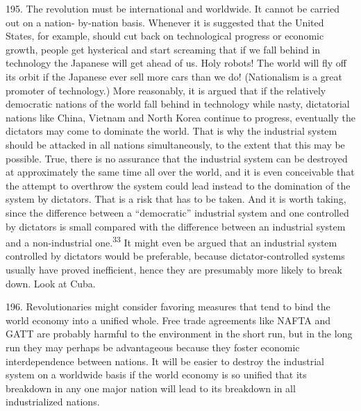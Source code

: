 \documentclass{article}
\begin{document}
195. The revolution must be international and worldwide. It cannot be carried out on a nation-
by-nation basis. Whenever it is suggested that the United States, for example, should cut back on 
technological progress or economic growth, people get hysterical and start screaming that if we 
fall behind in technology the Japanese will get ahead of us. Holy robots! The world will fly off its 
orbit if the Japanese ever sell more cars than we do! (Nationalism is a great promoter of 
technology.) More reasonably, it is argued that if the relatively democratic nations of the world 
fall behind in technology while nasty, dictatorial nations like China, Vietnam and North Korea 
continue to progress, eventually the dictators may come to dominate the world. That is why the 
industrial system should be attacked in all nations simultaneously, to the extent that this may be 
possible. True, there is no assurance that the industrial system can be destroyed at approximately 
the same time all over the world, and it is even conceivable that the attempt to overthrow the 
system could lead instead to the domination of the system by dictators. That is a risk that has to 
be taken. And it is worth taking, since the difference between a “democratic” industrial system 
and one controlled by dictators is small compared with the difference between an industrial system 
and a non-industrial one.\textsuperscript{33} It might even be argued that an industrial system controlled by dictators 
would be preferable, because dictator-controlled systems usually have proved inefficient, hence 
they are presumably more likely to break down. Look at Cuba. \vspace{\baselineskip}

196. Revolutionaries might consider favoring measures that tend to bind the world economy into 
a unified whole. Free trade agreements like NAFTA and GATT are probably harmful to the 
environment in the short run, but in the long run they may perhaps be advantageous because they 
foster economic interdependence between nations. It will be easier to destroy the industrial system 
on a worldwide basis if the world economy is so unified that its breakdown in any one major nation 
will lead to its breakdown in all industrialized nations. \vspace{\baselineskip}
\end{document}

